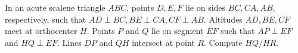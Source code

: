 In an acute scalene triangle $ABC$, points $D,E,F$ lie on sides $BC, CA, AB$, respectively, such that $AD \perp BC, BE \perp CA, CF \perp AB$. Altitudes $AD, BE, CF$ meet at orthocenter $H$. Points $P$ and $Q$ lie on segment $EF$ such that $AP \perp EF$ and $HQ \perp EF$. Lines $DP$ and $QH$ intersect at point $R$. Compute $HQ/HR$.
